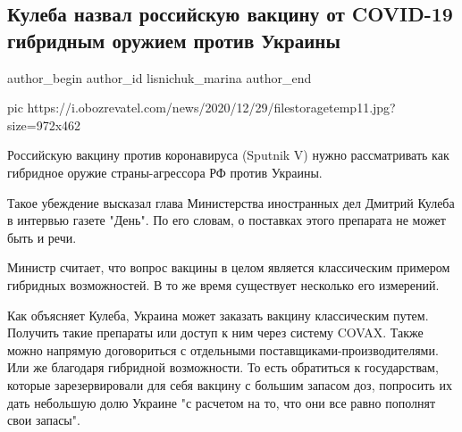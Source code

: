  
 
 
 
 
 
\subsection{Кулеба назвал российскую вакцину от COVID-19 гибридным оружием против Украины}
\label{sec:29_12_2020.news.ua.obozrevatel.lisnichuk_marina.1.kuleba_russia_sputnik_v_oruzhie}
\ifcmt
	author_begin
   author_id lisnichuk_marina
	author_end
\fi

\ifcmt
  pic https://i.obozrevatel.com/news/2020/12/29/filestoragetemp11.jpg?size=972x462
\fi

Российскую вакцину против коронавируса (Sputnik V) нужно рассматривать как
гибридное оружие страны-агрессора РФ против Украины.

Такое убеждение высказал глава Министерства иностранных дел Дмитрий Кулеба в
интервью газете "День". По его словам, о поставках этого препарата не может
быть и речи.

Министр считает, что вопрос вакцины в целом является классическим примером
гибридных возможностей. В то же время существует несколько его измерений.

Как объясняет Кулеба, Украина может заказать вакцину классическим путем.
Получить такие препараты или доступ к ним через систему COVAX. Также можно
напрямую договориться с отдельными поставщиками-производителями. Или же
благодаря гибридной возможности. То есть обратиться к государствам, которые
зарезервировали для себя вакцину с большим запасом доз, попросить их дать
небольшую долю Украине "с расчетом на то, что они все равно пополнят свои
запасы".

